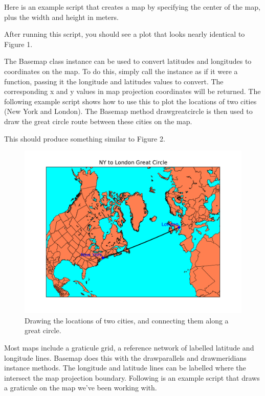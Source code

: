 \medskip{}
Here is an example script that creates a map by specifying the center
of the map, plus the width and height in meters.



After running this script, you should see a plot that looks nearly
identical to Figure 1.\medskip{}


The Basemap class instance can be used to convert latitudes and longitudes
to coordinates on the map. To do this, simply call the instance as
if it were a function, passing it the longitude and latitudes values
to convert. The corresponding x and y values in map projection coordinates
will be returned. The following example script shows how to use this
to plot the locations of two cities (New York and London). The Basemap
method drawgreatcircle is then used to draw the great circle route
between these cities on the map.



This should produce something similar to Figure 2.

\begin{figure}[h]
\includegraphics[scale=0.75]{fig/basemap3}

\caption{Drawing the locations of two cities, and connecting them along a great
circle.}

\end{figure}

\medskip{}
Most maps include a graticule grid, a reference network of labelled
latitude and longitude lines. Basemap does this with the drawparallels
and drawmeridians instance methods. The longitude and latitude lines
can be labelled where the intersect the map projection boundary. Following
is an example script that draws a graticule on the map we've been
working with.

